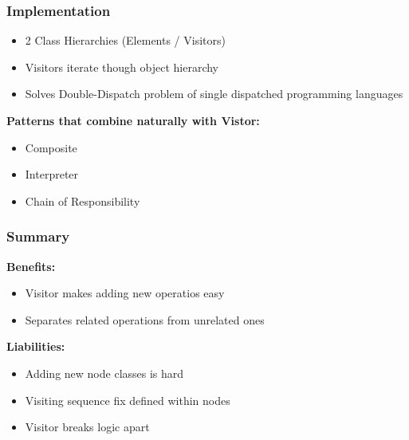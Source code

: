 \subsubsection{Implementation}
\begin{itemize}
    \item 2 Class Hierarchies (Elements / Visitors)
    \item Visitors iterate though object hierarchy
    \item Solves Double-Dispatch problem of single dispatched programming languages
\end{itemize}
\textbf{Patterns that combine naturally with Vistor:}
\begin{itemize}
    \item Composite
    \item Interpreter
    \item Chain of Responsibility
\end{itemize}
\subsubsection{Summary}
\textbf{Benefits:}
\begin{itemize}
    \item Visitor makes adding new operatios easy
    \item Separates related operations from unrelated ones
\end{itemize}
\textbf{Liabilities:}
\begin{itemize}
    \item Adding new node classes is hard
    \item Visiting sequence fix defined within nodes
    \item Visitor breaks logic apart
\end{itemize}
